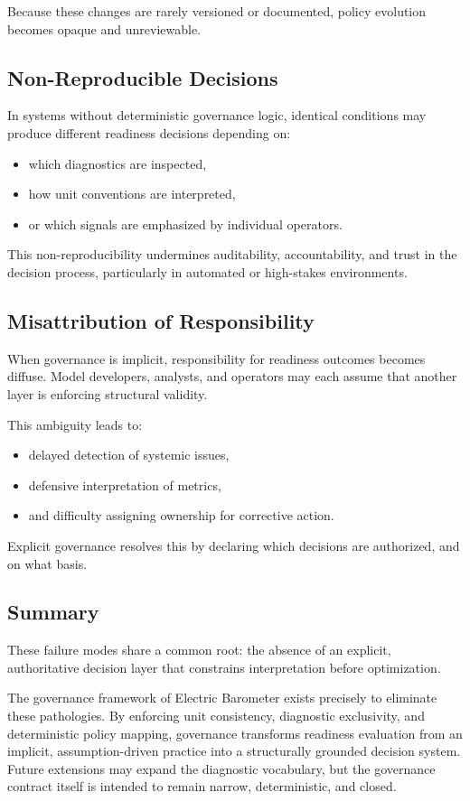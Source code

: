 Because these changes are rarely versioned or documented, policy evolution
becomes opaque and unreviewable.

\subsection{Non-Reproducible Decisions}

In systems without deterministic governance logic, identical conditions may
produce different readiness decisions depending on:
\begin{itemize}[leftmargin=1.5em]
  \item which diagnostics are inspected,
  \item how unit conventions are interpreted,
  \item or which signals are emphasized by individual operators.
\end{itemize}

This non-reproducibility undermines auditability, accountability, and trust in
the decision process, particularly in automated or high-stakes environments.

\subsection{Misattribution of Responsibility}

When governance is implicit, responsibility for readiness outcomes becomes
diffuse. Model developers, analysts, and operators may each assume that another
layer is enforcing structural validity.

This ambiguity leads to:
\begin{itemize}[leftmargin=1.5em]
  \item delayed detection of systemic issues,
  \item defensive interpretation of metrics,
  \item and difficulty assigning ownership for corrective action.
\end{itemize}

Explicit governance resolves this by declaring which decisions are authorized,
and on what basis.

\subsection{Summary}

These failure modes share a common root: the absence of an explicit, authoritative
decision layer that constrains interpretation before optimization.

The governance framework of Electric Barometer exists precisely to eliminate
these pathologies. By enforcing unit consistency, diagnostic exclusivity, and
deterministic policy mapping, governance transforms readiness evaluation from an
implicit, assumption-driven practice into a structurally grounded decision
system. Future extensions may expand the diagnostic vocabulary, but the
governance contract itself is intended to remain narrow, deterministic, and
closed.
